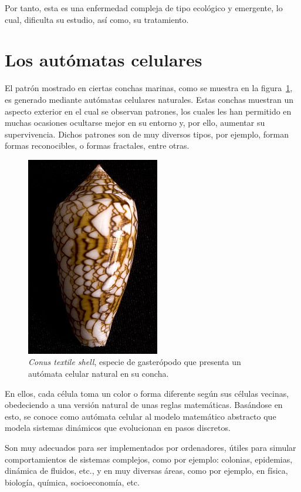 Por tanto, esta es una enfermedad compleja de tipo ecológico y emergente, lo cual, dificulta su estudio,
así como, su tratamiento.

\section{Los autómatas celulares}

El patrón mostrado en ciertas conchas marinas, como se muestra en la figura~\ref{fig:conus},
es generado mediante autómatas celulares naturales. Estas conchas muestran un aspecto exterior
en el cual se observan patrones, los cuales les han
permitido en muchas ocasiones ocultarse mejor en su entorno y, por ello, aumentar su supervivencia.
Dichos patrones son de muy diversos tipos, por ejemplo, forman formas reconocibles, o formas fractales,
entre otras.

\begin{figure}[h]
\centering
\includegraphics[scale=2]{figures/Conustextile}
\caption{\textit{Conus textile shell}, especie de gasterópodo que presenta un autómata celular natural en su concha.}
\label{fig:conus}
\end{figure}

\newpage

En ellos, cada célula toma un color o forma diferente según sus células vecinas, obedeciendo
a una versión natural de unas reglas matemáticas. Basándose en esto, se conoce como autómata celular
al modelo matemático abstracto que modela sistemas dinámicos que evolucionan en pasos discretos.

Son muy adecuados para ser implementados por ordenadores, útiles para simular comportamientos de sistemas
complejos, como por ejemplo: colonias, epidemias, dinámica de fluidos, etc., y en muy diversas áreas, como por ejemplo,
en física, biología, química, socioeconomía, etc.

